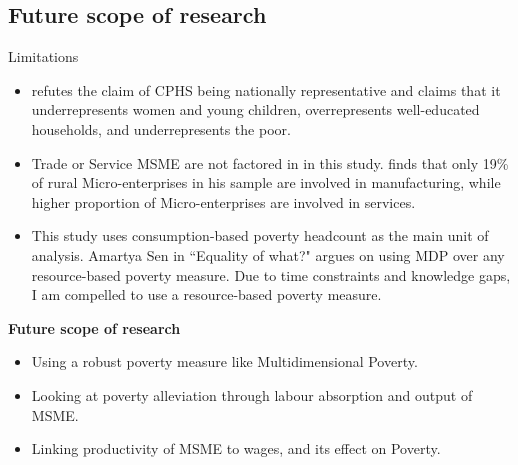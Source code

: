 \documentclass[10pt,aspectratio=169]{beamer}
\begin{document}
\subsection{Future scope of research}
\begin{frame}{Limitations}
    \fontsize{10pt}{12pt}\selectfont
\begin{itemize}
    \item \textcite{somanchi2021missing} refutes the claim of CPHS being nationally representative and claims that it underrepresents women and young children, overrepresents well-educated households, and underrepresents the poor.
    \item Trade or Service MSME are not factored in in this study. \textcite{kanitkar1994entrepreneurs} finds that only 19\%  of rural Micro-enterprises in his sample are involved in manufacturing, while higher proportion of Micro-enterprises are involved in services.
    \item  This study uses consumption-based poverty headcount as the main unit of analysis. Amartya Sen in ``Equality of what?"  argues on using MDP over any resource-based poverty measure. Due to time constraints and knowledge gaps, I am compelled to use a resource-based poverty measure. 
\end{itemize}   
    \vspace{0.5cm}
    \textbf{Future scope of research}
     \begin{itemize}
        \item Using a robust poverty measure like Multidimensional Poverty.
        \item Looking at poverty alleviation through labour absorption  and output of MSME.
        \item Linking productivity of MSME to wages, and its effect on Poverty.
    \end{itemize}
\end{frame}
\end{document}

